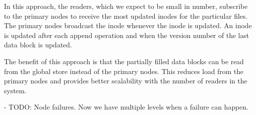\documentclass[]{article}
\begin{document}
In this approach, the readers, which we expect to be small in number, subscribe
to the primary nodes to receive the most updated inodes for the particular
files. The primary nodes broadcast the inode whenever the inode is updated. An
inode is updated after each append operation and when the version number of the
last data block is updated.

The benefit of this approach is that the partially filled data blocks
can be read from the global store instead of the primary nodes. This reduces
load from the primary nodes and provides better scalability with the number
of readers in the system.



%
%
%
%
%
%
%

- TODO: Node failures. Now we have multiple levels when a failure can happen.



%
%
%
%
%
%
%
%
%
\end{document}
